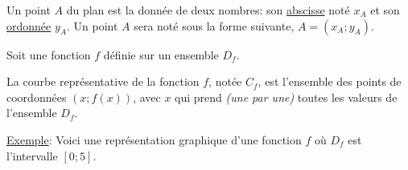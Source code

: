\documentclass[french]{book}
\begin{document}
\begin{defn}
Un point $A$ du plan est la donnée de deux nombres: son \underline{abscisse} noté $x_A$ et son \underline{ordonnée} $y_A$. Un point $A$ sera noté sous la forme suivante, $A=(x_A;y_A)$.
\end{defn}

Soit une fonction $f$ définie sur un ensemble $D_f$.

\begin{defn}

La courbe représentative de la fonction $f$, notée $C_f$,  est l’ensemble des points de coordonnées $(x ; f(x))$, avec $x$ qui prend \emph{(une par une)} toutes les valeurs de l'ensemble $D_f$.





\end{defn}




\underline{Exemple}: Voici une représentation graphique d'une fonction $f$ où $D_f$ est l'intervalle $[0;5]$.
\begin{center}
\end{center}
\end{document}
